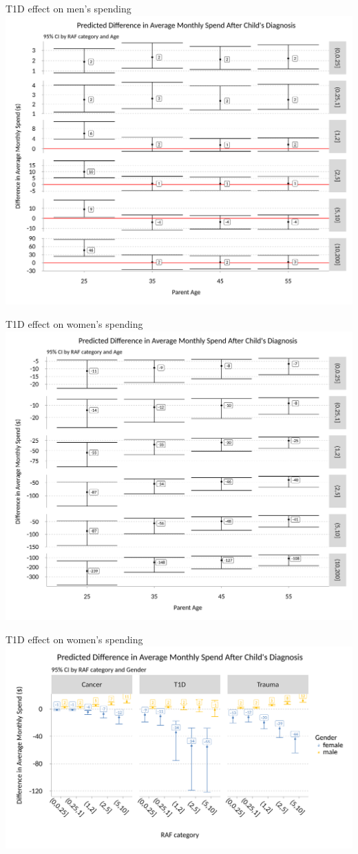 \documentclass[xcolor=x11names,compress]{beamer}
\renewcommand{\(}{\begin{columns}}
\renewcommand{\)}{\end{columns}}
\newcommand{\<}[1]{\begin{column}{#1}}
\renewcommand{\>}{\end{column}}
\begin{document}
\begin{frame}{T1D effect on men's spending}
\includegraphics[width=.75\linewidth]{../figures/predicted_spend_male_T1D.png}
\end{frame}

\begin{frame}{T1D effect on women's spending}
\includegraphics[width=.75\linewidth]{../figures/predicted_spend_female_T1D.png}
\end{frame}

\begin{frame}{T1D effect on women's spending}
\includegraphics[width=\linewidth]{../figures/spend_diff_Cancer_T1D.png}
\end{frame}
\end{document}
